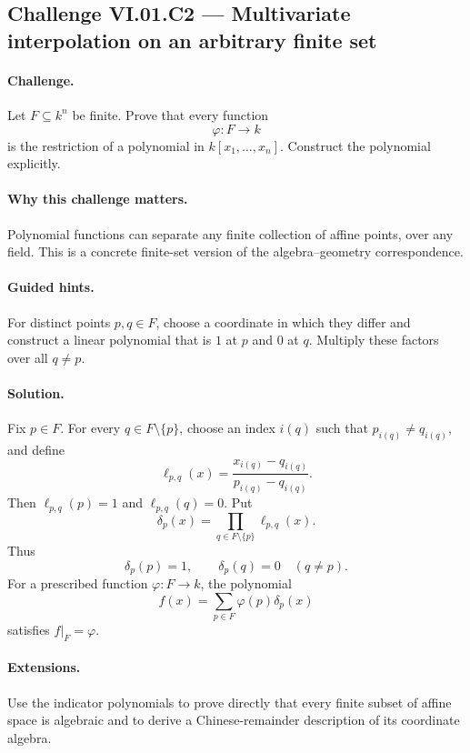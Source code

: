 \subsection*{Challenge VI.01.C2 --- Multivariate interpolation on an arbitrary finite set}
\label{chal:vi01-c2}

\paragraph{Challenge.}
Let \(F\subseteq k^n\) be finite.  Prove that every function
\[
\varphi:F\to k
\]
is the restriction of a polynomial in \(k[x_1,\dots,x_n]\).  Construct the polynomial
explicitly.

\ifdefined\FullProblemDossiers
\paragraph{Why this challenge matters.}
Polynomial functions can separate any finite collection of affine points, over any field.
This is a concrete finite-set version of the algebra--geometry correspondence.

\paragraph{Guided hints.}
For distinct points \(p,q\in F\), choose a coordinate in which they differ and construct a
linear polynomial that is \(1\) at \(p\) and \(0\) at \(q\).  Multiply these factors over
all \(q\neq p\).

\paragraph{Solution.}
Fix \(p\in F\).  For every \(q\in F\setminus\{p\}\), choose an index \(i(q)\) such that
\(p_{i(q)}\neq q_{i(q)}\), and define
\[
\ell_{p,q}(x)=
\frac{x_{i(q)}-q_{i(q)}}{p_{i(q)}-q_{i(q)}}.
\]
Then \(\ell_{p,q}(p)=1\) and \(\ell_{p,q}(q)=0\).  Put
\[
\delta_p(x)=\prod_{q\in F\setminus\{p\}}\ell_{p,q}(x).
\]
Thus
\[
\delta_p(p)=1,
\qquad
\delta_p(q)=0\quad(q\neq p).
\]
For a prescribed function \(\varphi:F\to k\), the polynomial
\[
f(x)=\sum_{p\in F}\varphi(p)\delta_p(x)
\]
satisfies \(f|_F=\varphi\).

\paragraph{Extensions.}
Use the indicator polynomials to prove directly that every finite subset of affine space is
algebraic and to derive a Chinese-remainder description of its coordinate algebra.
\fi
